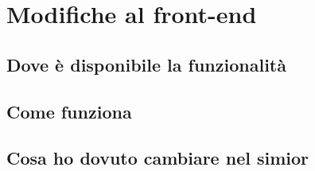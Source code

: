 \chapter{Modifiche al front-end}

\section{Dove è disponibile la funzionalità}
\section{Come funziona}
\section{Cosa ho dovuto cambiare nel simior}